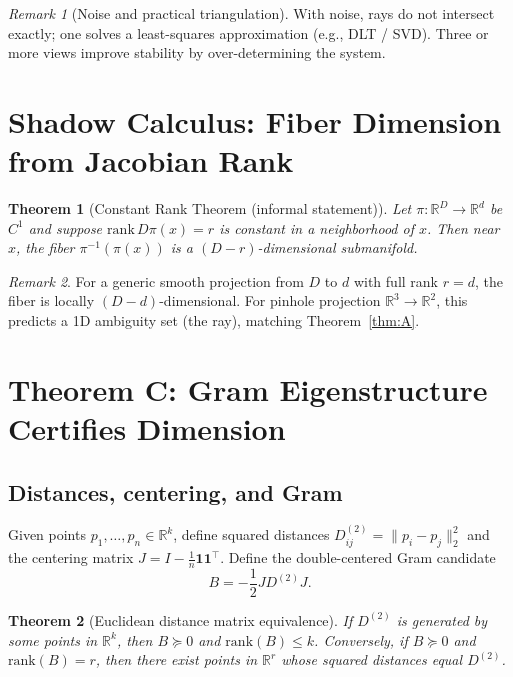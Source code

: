 \documentclass[11pt]{article}
\theoremstyle{definition}
\theoremstyle{plain}
\newtheorem{theorem}{Theorem}[section]
\theoremstyle{remark}
\newtheorem{remark}{Remark}[section]
\begin{document}
\begin{remark}[Noise and practical triangulation]
With noise, rays do not intersect exactly; one solves a least-squares approximation (e.g., DLT / SVD).
Three or more views improve stability by over-determining the system.
\end{remark}

\section{Shadow Calculus: Fiber Dimension from Jacobian Rank}

\begin{theorem}[Constant Rank Theorem (informal statement)]\label{thm:rank}
Let $\pi:\mathbb{R}^D\to\mathbb{R}^d$ be $C^1$ and suppose $\mathrm{rank}\,D\pi(x)=r$ is constant in a neighborhood of $x$.
Then near $x$, the fiber $\pi^{-1}(\pi(x))$ is a $(D-r)$-dimensional submanifold.
\end{theorem}

\begin{remark}
For a generic smooth projection from $D$ to $d$ with full rank $r=d$, the fiber is locally $(D-d)$-dimensional.
For pinhole projection $\mathbb{R}^3\to\mathbb{R}^2$, this predicts a 1D ambiguity set (the ray), matching Theorem~\ref{thm:A}.
\end{remark}

\section{Theorem C: Gram Eigenstructure Certifies Dimension}

\subsection{Distances, centering, and Gram}
Given points $p_1,\dots,p_n\in\mathbb{R}^k$, define squared distances $D^{(2)}_{ij}=\|p_i-p_j\|_2^2$ and the centering matrix $J=I-\frac{1}{n}\mathbf{1}\mathbf{1}^\top$.
Define the double-centered Gram candidate
\[
  B = -\frac{1}{2} J D^{(2)} J.
\]

\begin{theorem}[Euclidean distance matrix equivalence]\label{thm:C}
If $D^{(2)}$ is generated by some points in $\mathbb{R}^k$, then $B\succeq 0$ and $\mathrm{rank}(B)\le k$.
Conversely, if $B\succeq 0$ and $\mathrm{rank}(B)=r$, then there exist points in $\mathbb{R}^r$ whose squared distances equal $D^{(2)}$.
\end{theorem}
\end{document}
